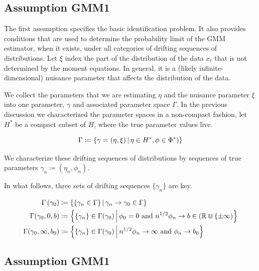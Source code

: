 \documentclass[11pt]{article}
\newcommand*{\R}{\mathbb{R}}
\newcommand*{\Eta}{H}
\newcommand{\mvert}[1][\middle]{\ensuremath{\,#1\vert\,}}
\begin{document}
\subsection{Assumption GMM1\label{Section GMM}}

The first assumption specifies the basic identification
problem. It also provides conditions that are used to determine the
probability limit of the GMM estimator, when it exists, under all categories
of drifting sequences of distributions.
Let $\xi$ index the part of the distribution of the data $x_t$ that is not determined by the moment equations.
In general, it is a (likely infinite-dimensional) nuisance parameter that affects the distribution of the data. 


We collect the parameters that we are estimating $\eta$ and the nuisance parameter $\xi$ into one parameter,
$\gamma$ and associated parameter space $\Gamma$.
In the previous discussion we characterized the parameter spaces in a non-compact fashion, let $\Eta^{*}$ be a
compact subset of $\Eta$, where the true parameter values live.

\begin{equation}
\Gamma \coloneqq \left\lbrace \gamma = (\eta, \xi) \mvert \eta \in \Eta^{*}, \phi \in \Phi^{*}) \right\rbrace 
\end{equation}

We characterize these drifting sequences of distributions by sequences of true parameters $\gamma_n \coloneqq
(\eta_n, \phi_n)$.

In what follows, three sets of drifting sequences $\lbrace \gamma_n \rbrace$ are key. 

\begin{align}
    \Gamma\left(\gamma_0\right) &\coloneqq \left\lbrace \left\lbrace \gamma_n \in \Gamma \right\rbrace \mvert
        \gamma_n \to \gamma_0 \in \Gamma \right\rbrace\\ 
    \Gamma(\gamma_0, 0, b) &\coloneqq \left\lbrace \lbrace \gamma_n \rbrace \in \Gamma(\gamma_0) \mvert \phi_0 =
        0\ \text{and}\ n^{1/2} \phi_n \to b \in (\R \Cup \lbrace \pm \infty) \right\rbrace \\
    \Gamma(\gamma_0, \infty, b_0) &\coloneqq \left\lbrace \lbrace \gamma_n \rbrace \in \Gamma (\gamma_0) \mvert
        n^{1/2} \phi_n \to \infty\ \text{and}\ \phi_n \to b_0 \right\rbrace 
\end{align}

\subsection{Assumption GMM1}
\end{document}
